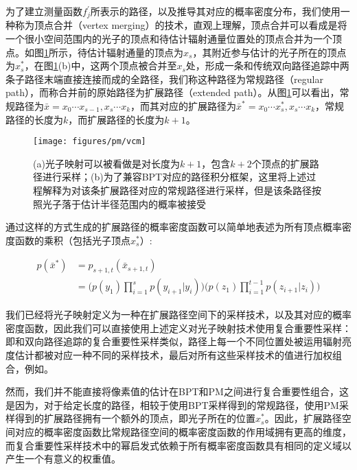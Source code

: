为了建立测量函数$f^{'}_j$所表示的路径，以及推导其对应的概率密度分布，我们使用一种称为顶点合并（vertex merging）的技术，直观上理解，顶点合并可以看成是将一个很小空间范围内的光子的顶点和待估计辐射通量位置处的顶点合并为一个顶点。如图\ref{f:pm-vcm}所示，待估计辐射通量的顶点为$x_s$，其附近参与估计的光子所在的顶点为$x^{*}_{s}$，在图\ref{f:pm-vcm}(b)中，这两个顶点被合并至$x_s$处，形成一条和传统双向路径追踪中两条子路径末端直接连接而成的全路径，我们称这种路径为常规路径（regular path），而称合并前的原始路径为扩展路径（extended path）。从图\ref{f:pm-vcm}可以看出，常规路径为$\bar{x}=x_0\cdots x_{s-1},x_s\cdots x_k$，而其对应的扩展路径为$\bar{x}^{*}=x_0\cdots x^{*}_{s},x_s\cdots x_k$，常规路径的长度为$k$，而扩展路径的长度为$k+1$。

\begin{figure}
\sidecaption
	\texttt{[image: figures/pm/vcm]}
	\caption{(a)光子映射可以被看做是对长度为$k+1$，包含$k+2$个顶点的扩展路径进行采样；(b)为了兼容BPT对应的路径积分框架，这里将上述过程解释为对该条扩展路径对应的常规路径进行采样，但是该条路径按照光子落于估计半径范围内的概率被接受}
	\label{f:pm-vcm}
\end{figure}

通过这样的方式生成的扩展路径的概率密度函数可以简单地表述为所有顶点概率密度函数的乘积（包括光子顶点$x^{*}_s$）:

\begin{equation}\label{e:pm-extended-path-pdf}
\begin{aligned}
	p(\bar{x}^{*})&=p_{s+1,t}(\bar{x}_{s+1,t})\\
	&=\Biggl(p(y_1)\prod^{s}_{i=1}p(y_{i+1}|y_i)\Biggl)\Biggl(p(z_1)\prod^{t-1}_{i=1}p(z_{i+1}|z_i)\Biggl)
\end{aligned}
\end{equation}

我们已经将光子映射定义为一种在扩展路径空间下的采样技术，以及其对应的概率密度函数，因此我们可以直接使用上述定义对光子映射技术使用复合重要性采样：即和双向路径追踪的复合重要性采样类似，路径上每一个不同位置处被运用辐射亮度估计都被对应一种不同的采样技术，最后对所有这些采样技术的值进行加权组合，例如\cite{a:BidirectionalPhotonMapping}。

然而，我们并不能直接将像素值的估计在BPT和PM之间进行复合重要性组合，这是因为，对于给定长度的路径，相较于使用BPT采样得到的常规路径，使用PM采样得到的扩展路径拥有一个额外的顶点，即光子所在的位置$x^{*}_s$。因此，扩展路径空间对应的概率密度函数比常规路径空间的概率密度函数的作用域拥有更高的维度，而复合重要性采样技术中的幂启发式依赖于所有概率密度函数具有相同的定义域以产生一个有意义的权重值。

